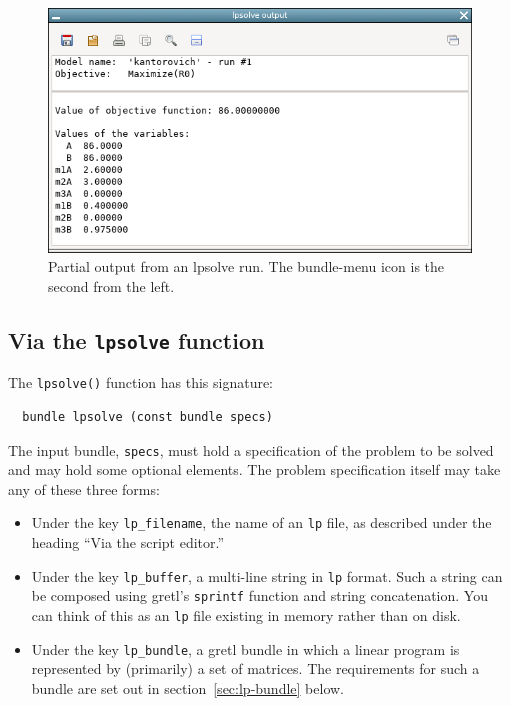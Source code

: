 \documentclass{article}
\begin{document}
\begin{figure}[p]
  \centering
  \includegraphics[scale=0.7]{figures/kantor-run}
  \caption{Partial output from an \textsf{lpsolve} run. The
    bundle-menu icon is the second from the left.}
  \label{fig:kantor2}
\end{figure}

\subsection{Via the \texttt{lpsolve} function}

The \texttt{lpsolve()} function has this signature:
\begin{verbatim}
  bundle lpsolve (const bundle specs)
\end{verbatim}

The input bundle, \texttt{specs}, must hold a specification of the
problem to be solved and may hold some optional elements.  The
problem specification itself may take any of these three forms:
\begin{itemize}
\item Under the key \texttt{lp\_filename}, the name of an \texttt{lp}
  file, as described under the heading ``Via the script editor.''
\item Under the key \texttt{lp\_buffer}, a multi-line string in
  \texttt{lp} format. Such a string can be composed using gretl's
  \texttt{sprintf} function and string concatenation. You can think of
  this as an \texttt{lp} file existing in memory rather than on disk.
\item Under the key \texttt{lp\_bundle}, a gretl bundle in which a
  linear program is represented by (primarily) a set of matrices. The
  requirements for such a bundle are set out in
  section~\ref{sec:lp-bundle} below.
\end{itemize}
\end{document}
